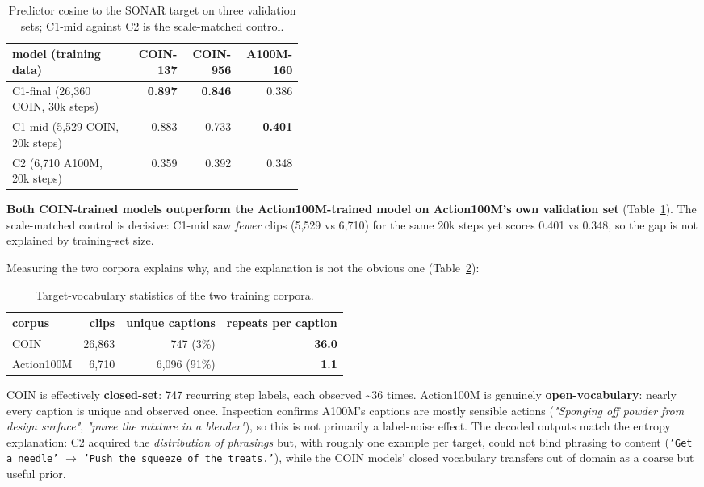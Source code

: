 \begin{table}[htbp]
\centering\small
\caption{Predictor cosine to the SONAR target on three validation sets; C1-mid against C2 is the scale-matched control.}
\label{tab:a100m}
\begin{tabular}{p{0.42\linewidth}rrr}
\toprule
\textbf{model (training data)} & \textbf{COIN-137} & \textbf{COIN-956} & \textbf{A100M-160} \\
\midrule
C1-final (26,360 COIN, 30k steps) & \textbf{0.897} & \textbf{0.846} & 0.386 \\
C1-mid (5,529 COIN, 20k steps) & 0.883 & 0.733 & \textbf{0.401} \\
C2 (6,710 A100M, 20k steps) & 0.359 & 0.392 & 0.348 \\
\bottomrule
\end{tabular}
\end{table}

\textbf{Both COIN-trained models outperform the Action100M-trained model on Action100M's own validation set} (Table~\ref{tab:a100m}). The scale-matched control is decisive: C1-mid saw \emph{fewer} clips (5,529 vs 6,710) for the same 20k steps yet scores 0.401 vs 0.348, so the gap is not explained by training-set size.

Measuring the two corpora explains why, and the explanation is not the obvious one (Table~\ref{tab:vocab}):

\begin{table}[htbp]
\centering\small
\caption{Target-vocabulary statistics of the two training corpora.}
\label{tab:vocab}
\begin{tabular}{lrrr}
\toprule
\textbf{corpus} & \textbf{clips} & \textbf{unique captions} & \textbf{repeats per caption} \\
\midrule
COIN & 26,863 & 747 (3\%) & \textbf{36.0} \\
Action100M & 6,710 & 6,096 (91\%) & \textbf{1.1} \\
\bottomrule
\end{tabular}
\end{table}

COIN is effectively \textbf{closed-set}: 747 recurring step labels, each observed \textasciitilde{}36 times. Action100M is genuinely \textbf{open-vocabulary}: nearly every caption is unique and observed once. Inspection confirms A100M's captions are mostly sensible actions (\emph{"Sponging off powder from design surface"}, \emph{"puree the mixture in a blender"}), so this is not primarily a label-noise effect. The decoded outputs match the entropy explanation: C2 acquired the \emph{distribution of phrasings} but, with roughly one example per target, could not bind phrasing to content (\texttt{'Get a needle'} $\rightarrow$ \texttt{'Push the squeeze of the treats.'}), while the COIN models' closed vocabulary transfers out of domain as a coarse but useful prior.

